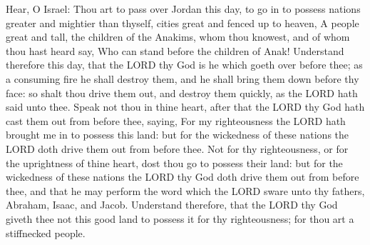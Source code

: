  Hear, O Israel: Thou art to pass over Jordan this day, to
go in to possess nations greater and mightier than thyself, cities great
and fenced up to heaven,  A people great and tall, the
children of the Anakims, whom thou knowest, and of whom thou hast heard
say, Who can stand before the children of Anak! 
Understand therefore this day, that the LORD thy God is he which goeth
over before thee; as a consuming fire he shall destroy them, and he
shall bring them down before thy face: so shalt thou drive them out, and
destroy them quickly, as the LORD hath said unto thee. 
Speak not thou in thine heart, after that the LORD thy God hath cast
them out from before thee, saying, For my righteousness the LORD hath
brought me in to possess this land: but for the wickedness of these
nations the LORD doth drive them out from before thee. 
Not for thy righteousness, or for the uprightness of thine heart, dost
thou go to possess their land: but for the wickedness of these nations
the LORD thy God doth drive them out from before thee, and that he may
perform the word which the LORD sware unto thy fathers, Abraham, Isaac,
and Jacob.  Understand therefore, that the LORD thy God
giveth thee not this good land to possess it for thy righteousness; for
thou art a stiffnecked people.

